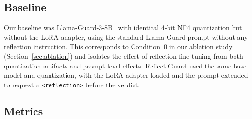 \documentclass[superintelligence,article,accept,moreauthors]{Definitions/mdpi}
\begin{document}
\subsection{Baseline}

Our baseline was Llama-Guard-3-8B~\citep{metallamaguard3} with identical 4-bit NF4 quantization but without the LoRA adapter, using the standard Llama Guard prompt without any reflection instruction. This corresponds to Condition~0 in our ablation study (Section~\ref{sec:ablation}) and isolates the effect of reflection fine-tuning from both quantization artifacts and prompt-level effects. Reflect-Guard used the same base model and quantization, with the LoRA adapter loaded and the prompt extended to request a \texttt{<reflection>} before the verdict.

\subsection{Metrics}
\label{sec:metrics}
\end{document}
